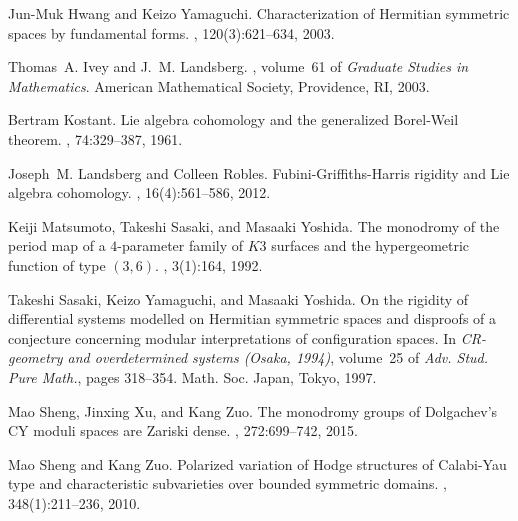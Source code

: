 \documentclass[12pt]{amsart}
\numberwithin{equation}{section}
\numberwithin{table}{section}
\numberwithin{figure}{section}
\begin{document}
\begin{thebibliography}{10}
Jun-Muk Hwang and Keizo Yamaguchi.
\newblock Characterization of {H}ermitian symmetric spaces by fundamental
  forms.
, 120(3):621--634, 2003.

Thomas~A. Ivey and J.~M. Landsberg.
, volume~61 of {\em Graduate Studies in
  Mathematics}.
\newblock American Mathematical Society, Providence, RI, 2003.

Bertram Kostant.
\newblock Lie algebra cohomology and the generalized {B}orel-{W}eil theorem.
, 74:329--387, 1961.

Joseph~M. Landsberg and Colleen Robles.
\newblock Fubini-{G}riffiths-{H}arris rigidity and {L}ie algebra cohomology.
, 16(4):561--586, 2012.

Keiji Matsumoto, Takeshi Sasaki, and Masaaki Yoshida.
\newblock The monodromy of the period map of a {$4$}-parameter family of {$K3$}
  surfaces and the hypergeometric function of type {$(3,6)$}.
, 3(1):164, 1992.

Takeshi Sasaki, Keizo Yamaguchi, and Masaaki Yoshida.
\newblock On the rigidity of differential systems modelled on {H}ermitian
  symmetric spaces and disproofs of a conjecture concerning modular
  interpretations of configuration spaces.
\newblock In {\em C{R}-geometry and overdetermined systems ({O}saka, 1994)},
  volume~25 of {\em Adv. Stud. Pure Math.}, pages 318--354. Math. Soc. Japan,
  Tokyo, 1997.

Mao Sheng, Jinxing Xu, and Kang Zuo.
\newblock The monodromy groups of {D}olgachev's {CY} moduli spaces are
  {Z}ariski dense.
, 272:699--742, 2015.

Mao Sheng and Kang Zuo.
\newblock Polarized variation of {H}odge structures of {C}alabi-{Y}au type and
  characteristic subvarieties over bounded symmetric domains.
, 348(1):211--236, 2010.

\end{thebibliography}
\end{document}
